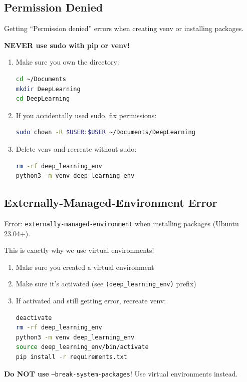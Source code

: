 \documentclass[11pt,a4paper]{article}
\begin{document}
\subsection{Permission Denied}

\begin{problembox}
Getting ``Permission denied'' errors when creating venv or installing packages.
\end{problembox}

\begin{solutionbox}
\textbf{NEVER use sudo with pip or venv!}

\begin{enumerate}
    \item Make sure you own the directory:
    \begin{lstlisting}[language=bash]
cd ~/Documents
mkdir DeepLearning
cd DeepLearning
    \end{lstlisting}
    
    \item If you accidentally used sudo, fix permissions:
    \begin{lstlisting}[language=bash]
sudo chown -R $USER:$USER ~/Documents/DeepLearning
    \end{lstlisting}
    
    \item Delete venv and recreate without sudo:
    \begin{lstlisting}[language=bash]
rm -rf deep_learning_env
python3 -m venv deep_learning_env
    \end{lstlisting}
\end{enumerate}
\end{solutionbox}

\subsection{Externally-Managed-Environment Error}

\begin{problembox}
Error: \texttt{externally-managed-environment} when installing packages (Ubuntu 23.04+).
\end{problembox}

\begin{solutionbox}
This is exactly why we use virtual environments!

\begin{enumerate}
    \item Make sure you created a virtual environment
    \item Make sure it's activated (see \texttt{(deep\_learning\_env)} prefix)
    \item If activated and still getting error, recreate venv:
    \begin{lstlisting}[language=bash]
deactivate
rm -rf deep_learning_env
python3 -m venv deep_learning_env
source deep_learning_env/bin/activate
pip install -r requirements.txt
    \end{lstlisting}
\end{enumerate}

\textbf{Do NOT use} \texttt{--break-system-packages}! Use virtual environments instead.
\end{solutionbox}
\end{document}
